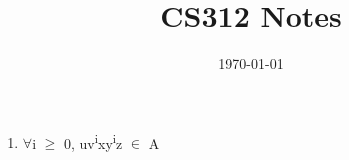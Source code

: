 \documentclass[11pt]{article}
\date{\today}
\title{CS312 Notes}
\begin{document}
\maketitle
\tableofcontents

\begin{enumerate}
\item \(\forall\)i \(\ge\) 0, uv\textsuperscript{i}xy\textsuperscript{i}z \(\in\) A\\
\end{enumerate}
\end{document}
